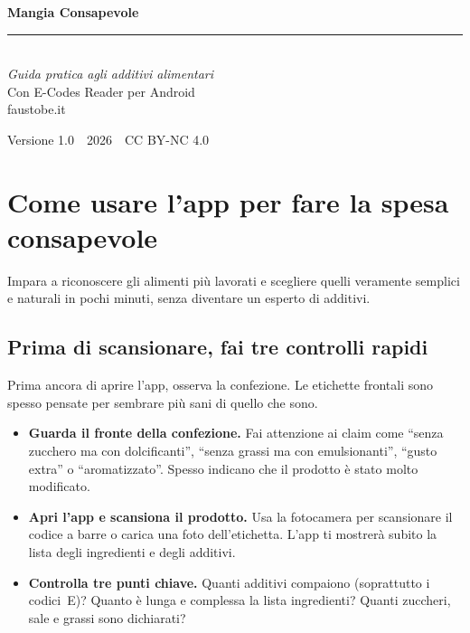 \documentclass[a5paper,12pt,oneside,openany]{book}
\begin{document}
\begin{titlepage}
\pagecolor{verdescuro}
\color{white}
\vspace*{2.5cm}
\begin{center}
  {\fontsize{38}{44}\selectfont\bfseries Mangia Consapevole}\\[1.2cm]
  \textcolor{verdecharo}{\rule{6cm}{0.6pt}}\\[1.2cm]
  {\large\itshape Guida pratica agli additivi alimentari}\\[0.6cm]
  {\normalsize Con E-Codes Reader per Android}\\[3cm]
  {\normalsize\textcolor{verdecharo}{faustobe.it}}
\end{center}
\vfill
\begin{center}
  {\small Versione 1.0\ \textbullet\ 2026\ \textbullet\ CC BY-NC 4.0}
\end{center}
\end{titlepage}
\nopagecolor

\frontmatter
\tableofcontents
\mainmatter

\chapter{Come usare l'app per fare la spesa consapevole}

Impara a riconoscere gli alimenti più lavorati e scegliere quelli
veramente semplici e naturali in pochi minuti, senza diventare
un esperto di additivi.

\section{Prima di scansionare, fai tre controlli rapidi}

Prima ancora di aprire l'app, osserva la confezione. Le etichette
frontali sono spesso pensate per sembrare più sani di quello che sono.

\begin{itemize}
  \item \textbf{Guarda il fronte della confezione.} Fai attenzione ai
    claim come ``senza zucchero ma con dolcificanti'', ``senza grassi ma
    con emulsionanti'', ``gusto extra'' o ``aromatizzato''. Spesso indicano
    che il prodotto è stato molto modificato.
  \item \textbf{Apri l'app e scansiona il prodotto.} Usa la fotocamera per
    scansionare il codice a barre o carica una foto dell'etichetta.
    L'app ti mostrerà subito la lista degli ingredienti e degli additivi.
  \item \textbf{Controlla tre punti chiave.} Quanti additivi compaiono
    (soprattutto i codici~E)? Quanto è lunga e complessa la lista
    ingredienti? Quanti zuccheri, sale e grassi sono dichiarati?
\end{itemize}
\end{document}

